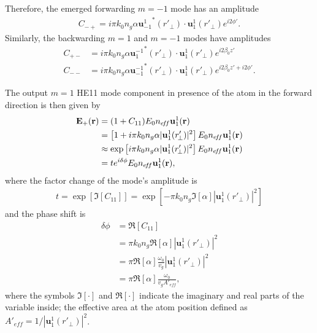 Therefore, the emerged forwarding $ m=-1 $ mode has an amplitude 
\begin{align}
C_{-+}=i\pi k_0 n_g\alpha  {\mathbf{u}^1_{-1}}^*(r'_{\!\perp})\cdot \mathbf{u}_1^1(r'_{\!\perp})e^{i2\phi'}.
\end{align}
Similarly, the backwarding $ m=1 $ and $ m=-1 $ modes have amplitudes 
\begin{align}
C_{+-} &=i\pi k_0 n_g\alpha  {\mathbf{u}^{-1}_1}^*(r'_{\!\perp})\cdot \mathbf{u}_1^1(r'_{\!\perp})e^{i2\beta_0 z'}\\
C_{--} &=i\pi k_0 n_g\alpha  {\mathbf{u}^{-1}_{-1}}^*(r'_{\!\perp})\cdot \mathbf{u}_1^1(r'_{\!\perp})e^{i2\beta_0 z'+i2\phi'}.
\end{align}

The output $ m=1 $ HE11 mode component in presence of the atom in the forward direction is then given by
\begin{align}
\mathbf{E}_+(\br) &= (1+C_{11})E_0n_{e\!f\!f}\mathbf{u}_{1}^{1} (\br)\\
&=\left[1 +i\pi k_0 n_g\alpha  | \mathbf{u}_1^1(r'_{\!\perp})|^2 \right] E_0n_{e\!f\!f}\mathbf{u}_{1}^{1} (\br)\\
&\approx \exp\left[i\pi k_0 n_g\alpha  | \mathbf{u}_1^1(r'_{\!\perp})|^2 \right] E_0n_{e\!f\!f}\mathbf{u}_{1}^{1} (\br)\\
&= te^{i\delta\phi}E_0n_{e\!f\!f}\mathbf{u}_{1}^{1} (\br), 
\end{align}
where the factor change of the mode's amplitude is 
\begin{align}
t=\exp\left[\Im[C_{11}]\right]=\exp\left[ -\pi k_0 n_g \Im[\alpha]  | \mathbf{u}_1^1(r'_{\!\perp})|^2 \right]
\end{align}
and the phase shift is
\begin{align}
\delta\phi &= \Re[C_{11}]\\
&=\pi k_0 n_g\Re[\alpha]  | \mathbf{u}_1^1(r'_{\!\perp})|^2\\
&= \pi \Re[\alpha] \frac{\omega_0}{v_g}  | \mathbf{u}_1^1(r'_{\!\perp})|^2\\
&= \pi \Re[\alpha] \frac{\omega_0}{v_gA'_{e\!f\!f}},
\end{align}
where the symbols $ \Im[\cdot] $ and $ \Re[\cdot] $ indicate the imaginary and real parts of the variable inside; the effective area at the atom position defined as $ A'_{e\!f\!f}=1/| \mathbf{u}_1^1(r'_{\!\perp})|^2 $. 

